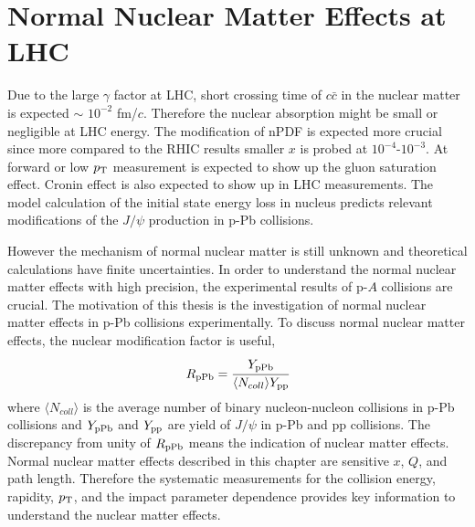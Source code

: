 \section{Normal Nuclear Matter Effects at LHC}
Due to the large $\gamma$ factor at LHC, short crossing time of $c\bar{c}$ in the nuclear matter is expected $\sim$ $10^{-2}$ fm/$c$.
Therefore the nuclear absorption might be small or negligible at LHC energy.
The modification of nPDF is expected more crucial since more compared to the RHIC results smaller $x$ is probed at $10^{-4}$-$10^{-3}$.  
At forward or low $p_{\rm{T}}$ measurement is expected to show up the gluon saturation effect.
Cronin effect is also expected to show up in LHC measurements. 
The model calculation of the initial state energy loss in nucleus predicts relevant modifications of the $J/\psi$ production in p-Pb collisions. 

However the mechanism of normal nuclear matter is still unknown and theoretical calculations have finite uncertainties. 
In order to understand the normal nuclear matter effects with high precision, the experimental results of p-$A$ collisions are crucial. 
The motivation of this thesis is the investigation of normal nuclear matter effects in p-Pb collisions experimentally. 
To discuss normal nuclear matter effects, the nuclear modification factor is useful, 
\begin{equation}
  R_{\rm{pPb}} = \cfrac{Y_{\rm{pPb}}}{\langle N_{coll}\rangle Y_{\rm{pp}}}
\end{equation}
where $\langle N_{coll} \rangle$ is the average number of binary nucleon-nucleon collisions in p-Pb collisions and $Y_{\rm{pPb}}$ and $Y_{\rm{pp}}$ are yield of $J/\psi$ in p-Pb and pp collisions. 
The discrepancy from unity of $R_{\rm{pPb}}$ means the indication of nuclear matter effects. 
Normal nuclear matter effects described in this chapter are sensitive $x$, $Q$, and path length. 
Therefore the systematic measurements for the collision energy, rapidity, $p_{\rm{T}}$, and the impact parameter dependence provides  key information to understand the nuclear matter effects. 


